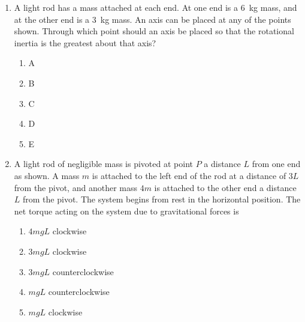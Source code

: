 \documentclass{../../../oss-classkick}
\begin{document}
\begin{multicols*}{2}
\begin{enumerate}[leftmargin=18pt]
  \item A light rod has a mass attached at each end. At one end is a
    \SI{6}{\kilo\gram} mass, and at the other end is a \SI{3}{\kilo\gram} mass.
    An axis can be placed at any of the points shown. Through which point
    should an axis be placed so that the rotational inertia is the greatest
    about that axis?
     \begin{center}
    \end{center}
    \begin{enumerate}[nosep,leftmargin=18pt,label=(\Alph*)]
    \item A
    \item B
    \item C
    \item D
    \item E
    \end{enumerate}

  \item A light rod of negligible mass is pivoted at point $P$ a distance $L$
    from one end as shown. A mass $m$ is attached to the left end of the rod at
    a distance of $3L$ from the pivot, and another mass $4m$ is attached to the
    other end a distance $L$ from the pivot. The system begins from rest in the
    horizontal position. The net torque acting on the system due to
    gravitational forces is
    \begin{center}
    \end{center}
    \begin{enumerate}[nosep,leftmargin=18pt,label=(\Alph*)]
    \item $4mgL$ clockwise
    \item $3mgL$ clockwise
    \item $3mgL$ counterclockwise
    \item $mgL$ counterclockwise
    \item $mgL$ clockwise
    \end{enumerate}
    \vspace{.7in}
    

\end{enumerate}
\end{multicols*}
\end{document}
